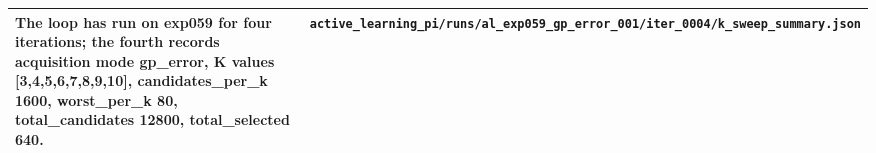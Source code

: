 \begin{longtable}{p{} p{}}
The loop has run on exp059 for four iterations; the fourth records acquisition mode gp\_error, K values [3,4,5,6,7,8,9,10], candidates\_per\_k 1600, worst\_per\_k 80, total\_candidates 12800, total\_selected 640. & \texttt{active\_\allowbreak{}learning\_\allowbreak{}pi/\allowbreak{}runs/\allowbreak{}al\_\allowbreak{}exp059\_\allowbreak{}gp\_\allowbreak{}error\_\allowbreak{}001/\allowbreak{}iter\_\allowbreak{}0004/\allowbreak{}k\_\allowbreak{}sweep\_\allowbreak{}summary.json} \\
\hline
\end{longtable}
\endgroup

